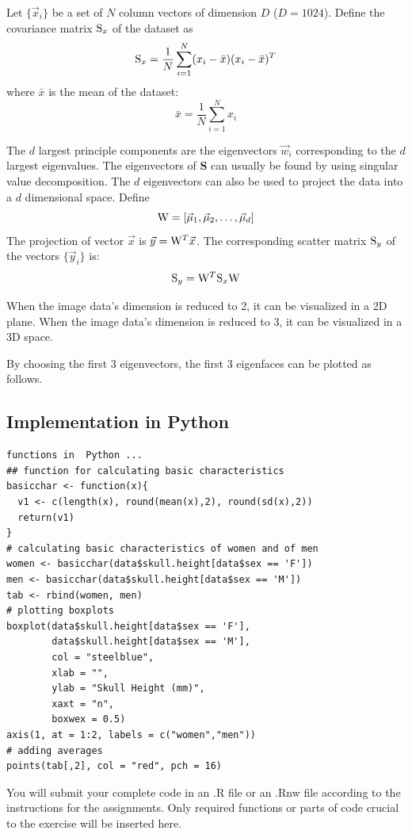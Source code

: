 Let $\{ \vec{x}_i \}$ be a set of $N$ column vectors of dimension $D$ ($D=1024$).
Define the covariance matrix ${\bf \rm S}_x$ of the dataset as
$$
	{\bf \rm S}_x = \frac{1}{N} \sum^N_{i=1} ( x_i - \bar{x} )( x_i - \bar{x} )^{T}
$$
where $\bar{x}$ is the mean of the dataset:
$$
	\bar{x} = \frac{1}{N} \sum^N_{i=1} x_i
$$

The $d$ largest principle components are the eigenvectors
$\vec{w}_i$ corresponding to the $d$ largest eigenvalues. The eigenvectors of {\bf S} can usually be found by using 
singular value decomposition. The $d$ eigenvectors can also be used to project the data into a
$d$ dimensional space.
Define
$$
{\bf \rm W} = [\vec{\mu}_1, \vec{\mu}_2, \dots, \vec{\mu}_d ]
$$
The projection of vector $\vec{x}$ is $\vec{y} = {\bf \rm W}^T \vec{x}$.
The corresponding scatter matrix ${\bf \rm S}_y$ of the
vectors $\{ \vec{y}_i \}$ is:
$$
{\bf \rm S}_y = {\bf \rm W}^T {\bf \rm S}_x {\bf \rm W}
$$

When the image data's dimension is reduced to 2, it can be visualized in a 2D plane.
When the image data's dimension is reduced to 3, it can be visualized in a 3D space.

By choosing the first 3 eigenvectors, the first 3 eigenfaces can be plotted as follows.

\subsection*{Implementation in Python}
\begin{lstlisting}
functions in  Python ...
## function for calculating basic characteristics
basicchar <- function(x){
  v1 <- c(length(x), round(mean(x),2), round(sd(x),2))
  return(v1)
}
# calculating basic characteristics of women and of men
women <- basicchar(data$skull.height[data$sex == 'F'])
men <- basicchar(data$skull.height[data$sex == 'M'])
tab <- rbind(women, men)
# plotting boxplots
boxplot(data$skull.height[data$sex == 'F'], 
        data$skull.height[data$sex == 'M'],
        col = "steelblue", 
        xlab = "",
        ylab = "Skull Height (mm)",
        xaxt = "n", 
        boxwex = 0.5)
axis(1, at = 1:2, labels = c("women","men"))
# adding averages
points(tab[,2], col = "red", pch = 16)
\end{lstlisting}

You will submit your complete code in an \textsf{.R} file or an \textsf{.Rnw} file according to the instructions for the assignments. Only required functions or parts of code crucial to the exercise will be inserted here.
\bigskip
